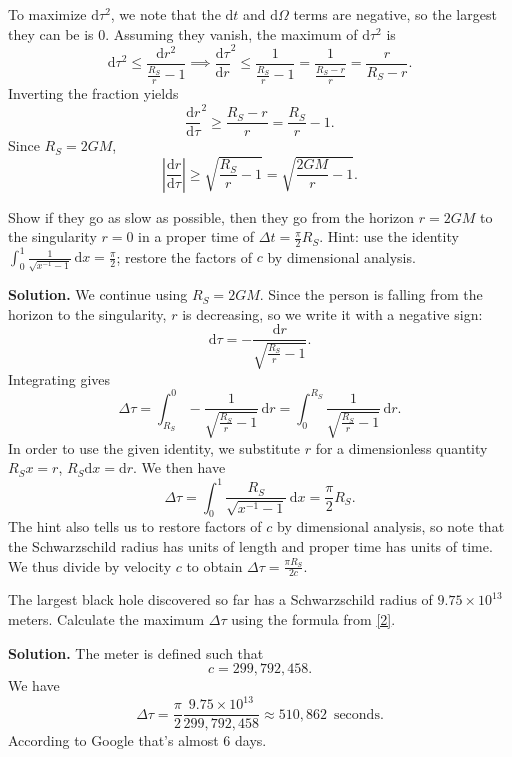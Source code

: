 \documentclass[11pt, letterpaper]{article}
\begin{document}
To maximize $\mathrm{d} \tau ^2$, we note that the $\mathrm{d} t$ and $\mathrm{d} \Omega $ terms are negative, so the largest they can be is 0. Assuming they vanish, the maximum of $\mathrm{d} \tau ^2$ is
\[
	\mathrm{d} \tau ^2 \leq \frac{\mathrm{d} r^2}{\frac{R_S}{r} -1} \implies \frac{\mathrm{d}\tau }{\mathrm{d}r} ^2 \leq \frac{1}{\frac{R_S}{r} -1} =\frac{1}{\frac{R_S-r}{r} } =\frac{r}{R_S-r} 
.\]
Inverting the fraction yields
\[
	\frac{\mathrm{d}r}{\mathrm{d}\tau } ^2 \geq \frac{R_S-r}{r} =\frac{R_S}{r} -1
.\]
Since $R_S=2GM$,
\[
	\left| \frac{\mathrm{d}r}{\mathrm{d}\tau }  \right| \geq \sqrt{\frac{R_S}{r} -1} =\sqrt{\frac{2GM}{r} -1} 
.\]
\begin{problem}\label{2}
	Show if they go as slow as possible, then they go from the horizon $r=2GM$ to the singularity $r=0$ in a proper time of $\Delta t=\frac{\pi }{2} R_S$. Hint: use the identity $\int_{0}^{1} \frac{1}{\sqrt{x^{-1} -1} }  \,\mathrm{d} x=\frac{\pi }{2} $; restore the factors of $c$ by dimensional analysis.
\end{problem}
\noindent\textbf{Solution.} We continue using $R_S=2GM$. Since the person is falling from the horizon to the singularity, $r$ is decreasing, so we write it with a negative sign:
\[
	\mathrm{d} \tau =-\frac{\mathrm{d} r}{\sqrt{\frac{R_S}{r} -1} } 
.\]
Integrating gives
\[
	\Delta \tau =\int_{R_S}^{0} -\frac{1}{\sqrt{\frac{R_S}{r} -1}}  \,\mathrm{d} r=\int_{0}^{R_S} \frac{1}{\sqrt{\frac{R_S}{r} -1} }  \,\mathrm{d} r
.\]
In order to use the given identity, we substitute $r$ for a dimensionless quantity $R_Sx=r$, $R_S\mathrm{d} x=\mathrm{d} r$. We then have
\[
	\Delta \tau =\int_{0}^{1} \frac{R_S}{\sqrt{x ^{-1} -1} } \,\mathrm{d} x=\frac{\pi }{2} R_S
.\]
The hint also tells us to restore factors of $c$ by dimensional analysis, so note that the Schwarzschild radius has units of length and proper time has units of time. We thus divide by velocity $c$ to obtain $\Delta \tau =\frac{\pi R_S}{2c} $.

\begin{problem}
	The largest black hole discovered so far has a Schwarzschild radius of $9.75\times 10^{13} $ meters. Calculate the maximum $\Delta \tau $ using the formula from \cref{2}.
\end{problem}
\noindent \textbf{Solution.} The meter is defined such that
\[
	c=299,792,458
.\]
We have
\[
	\Delta \tau =\frac{\pi }{2} \frac{9.75 \times 10^{13} }{299,792,458} \approx 510,862\,\text{ seconds}.
\]
According to Google that's almost 6 days.
\end{document}
